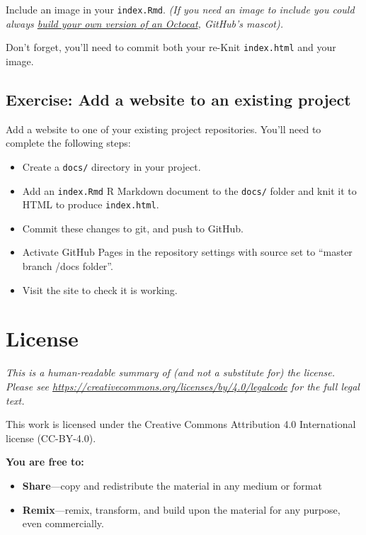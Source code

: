 \documentclass[]{Nemilov}
\providecommand{\tightlist}{%
  \setlength{\itemsep}{0pt}\setlength{\parskip}{0pt}}
\begin{document}
Include an image in your \texttt{index.Rmd}. \emph{(If you need an image to include you could always \href{https://myoctocat.com}{build your own version of an Octocat}, GitHub's mascot).}

Don't forget, you'll need to commit both your re-Knit \texttt{index.html} and your image.

\hypertarget{exercise-add-a-website-to-an-existing-project}{%
\section{Exercise: Add a website to an existing project}\label{exercise-add-a-website-to-an-existing-project}}

Add a website to one of your existing project repositories. You'll need to complete the following steps:

\begin{itemize}
\tightlist
\item
  Create a \texttt{docs/} directory in your project.
\item
  Add an \texttt{index.Rmd} R Markdown document to the \texttt{docs/} folder and knit it to HTML to produce \texttt{index.html}.
\item
  Commit these changes to git, and push to GitHub.
\item
  Activate GitHub Pages in the repository settings with source set to ``master branch /docs folder''.
\item
  Visit the site to check it is working.
\end{itemize}

\hypertarget{appendix-appendix}{%
\appendix}


\hypertarget{license}{%
\chapter{License}\label{license}}

\emph{This is a human-readable summary of (and not a substitute for) the license.
Please see \url{https://creativecommons.org/licenses/by/4.0/legalcode} for the full legal text.}

This work is licensed under the Creative Commons Attribution 4.0
International license (CC-BY-4.0).

\textbf{You are free to:}

\begin{itemize}
\item
  \textbf{Share}---copy and redistribute the material in any medium or
  format
\item
  \textbf{Remix}---remix, transform, and build upon the material for any
  purpose, even commercially.
\end{itemize}
\end{document}
